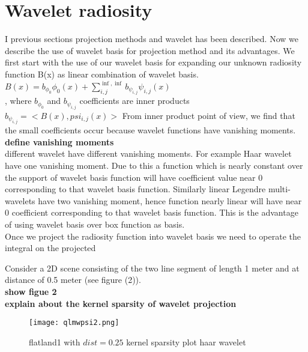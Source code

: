 \chapter{\label{ch:waveletprojection}Wavelet radiosity}
I previous sections projection methods and wavelet has been described. Now we describe the use of wavelet basis for projection method and its advantages. 
We first start with the use of our wavelet basis for expanding our unknown radiosity function B(x) as linear combination of wavelet basis.\\

$B(x) = b_{\phi_0}\phi_0(x)+\sum_{i,j}^{\inf,\inf}b_{\psi_{i,j}}\psi_{i,j}(x)$\\,
where $b_{\phi_0}$ and $b_{\psi_{i,j}}$ coefficients are inner products\\
$b_{\psi_{i,j}}=<B(x),psi_{i,j}(x)>$
From inner product point of view, we find that the small coefficients occur because wavelet functions have vanishing moments.
{\bf define vanishing moments}\\

different wavelet have different vanishing moments. For example Haar wavelet have one vanishing moment. Due to this a function which is nearly constant over the support of wavelet basis function will have coefficient value near 0 corresponding to that wavelet basis function. Similarly linear Legendre multi-wavelets have two vanishing moment, hence function nearly linear will have near 0 coefficient corresponding to that wavelet basis function. This is the advantage of using wavelet basis over box function as basis.\\

Once we project the radiosity function into wavelet basis we need to operate the integral on the projected 

Consider a 2D scene consisting of the two line segment of length 1 meter and at distance of 0.5 meter (see figure (2)). \\

{\bf show figue 2}\\

{\bf explain about the kernel sparsity of wavelet projection }\\


\begin{figure}[tbh]
\centering{}
\captionsetup{justification=centering}
\texttt{[image: qlmwpsi2.png]}
\caption{\label{fig:replacethis6}flatland1 with $dist=0.25$ kernel sparsity plot haar wavelet}
\end{figure}

